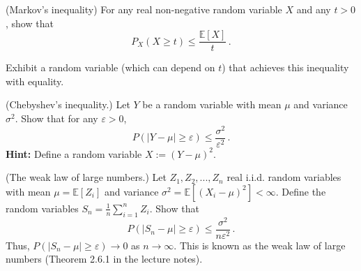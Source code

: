 \documentclass[a4paper,10pt,landscape,twocolumn]{scrartcl}
\begin{document}
\homeworkproblems

\begin{exercise}
	\begin{subex}[(3pt)] (Markov's inequality) For any real non-negative random variable $X$ and any $t > 0$, show that
	\[
	P_X(X \geq t) \leq \frac{\mathbb{E}[X]}{t}\, .
	\]
\end{subex}
\begin{subex}
	Exhibit a random variable (which can depend on $t$) that achieves this inequality with equality.
	\end{subex}
	\begin{subex}[(2pt)] (Chebyshev's inequality.) Let $Y$ be a random variable with mean $\mu$ and variance $\sigma^2$. Show that for any $\varepsilon > 0$,
	\[
	P(|Y - \mu| \geq \varepsilon) \leq \frac{\sigma^2}{\varepsilon^2} \, .
	\]
	\textbf{Hint:} Define a random variable $X := (Y - \mu)^2$.
	\end{subex}
	\begin{subex}[(2pt)] (The weak law of large numbers.) Let $Z_1, Z_2, ..., Z_n$ real i.i.d. random variables with mean $\mu = \mathbb{E}[Z_i]$ and variance $\sigma^2 = \mathbb{E}[(X_i - \mu)^2] < \infty$. Define the random variables $S_n = \frac{1}{n} \sum_{i=1}^n Z_i$. Show that
	\[
	P(|S_n - \mu | \geq \varepsilon) \leq \frac{\sigma^2}{n\varepsilon^2}\, .
	\]
	Thus, $P(|S_n - \mu| \geq \varepsilon) \to 0$ as $n \to \infty$. This is known as the weak law of large numbers (Theorem 2.6.1 in the lecture notes).
	\end{subex}
\end{exercise}
\end{document}
